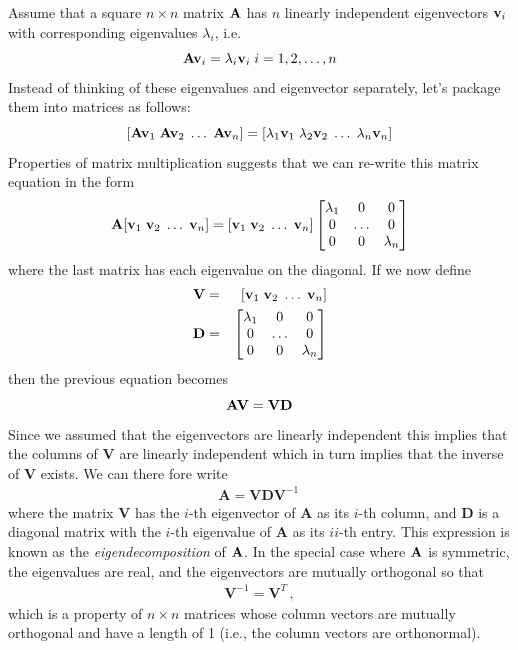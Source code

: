 Assume that a square $n \times n$ matrix $\mathbf{A}$ has $n$ linearly independent eigenvectors $\mathbf{v}_i$ with corresponding eigenvalues $\lambda_i$, i.e.
\[\mathbf{A} \mathbf{v}_i = \lambda_i \mathbf{v}_i \; i=1,2,\ldots,n\]
Instead of thinking of these eigenvalues and eigenvector separately, let's package them into matrices as follows:
\[[\mathbf{A} \mathbf{v}_1 \; \mathbf{A} \mathbf{v}_2 \; \ldots \; \mathbf{A} \mathbf{v}_n ] = [\lambda_1 \mathbf{v}_1 \; \lambda_2 \mathbf{v}_2 \; \ldots \; \lambda_n \mathbf{v}_n] \]
Properties of matrix multiplication suggests that we can re-write this matrix equation in the form
\[\mathbf{A} [\mathbf{v}_1 \; \mathbf{v}_2 \; \ldots \; \mathbf{v}_n ] = [\mathbf{v}_1 \; \mathbf{v}_2 \; \ldots \; \mathbf{v}_n ] \begin{bmatrix} \lambda_1 & 0 & 0 \\ 0 & \ldots & 0 \\ 0 & 0 & \lambda_n \end{bmatrix}\]
where the last matrix has each eigenvalue on the diagonal. If we now define 
\begin{eqnarray*}
\mathbf{V} &=& [\mathbf{v}_1 \; \mathbf{v}_2 \; \ldots \; \mathbf{v}_n] \\
\mathbf{D} &=& \begin{bmatrix} \lambda_1 & 0 & 0 \\ 0 & \ldots & 0 \\ 0 & 0 & \lambda_n \end{bmatrix}
\end{eqnarray*}
then the previous equation becomes
\[\mathbf{A} \mathbf{V} = \mathbf{V} \mathbf{D}\]
Since we assumed that the eigenvectors are linearly independent this implies that the columns of $\mathbf{V}$ are linearly independent which in turn implies that the inverse of $\mathbf{V}$ exists. We can there fore write
\begin{align}
\mathbf{A} = \mathbf{V}\mathbf{D}\mathbf{V}^{-1}\, 
\label{eqnEvalDecomposition}
\end{align}
where the matrix $\mathbf{V}$ has the $i$-th eigenvector of $\mathbf{A}$ as its $i$-th column, and $\mathbf{D}$ is a diagonal matrix with the $i$-th eigenvalue of $\mathbf{A}$ as its $ii$-th entry. This expression is known as the \textit{eigendecomposition} of $\mathbf{A}$.
In the special case where $\mathbf{A}$ is symmetric, the eigenvalues are real, and the eigenvectors are mutually orthogonal so that
\begin{eqnarray*}
\mathbf{V}^{-1}  = \mathbf{V}^{T} \,, \label{eqn:OrthSymmetry}
\end{eqnarray*}
which is a property of $n\times n$ matrices whose column vectors are mutually orthogonal and have a length of 1 (i.e., the column vectors are orthonormal).


